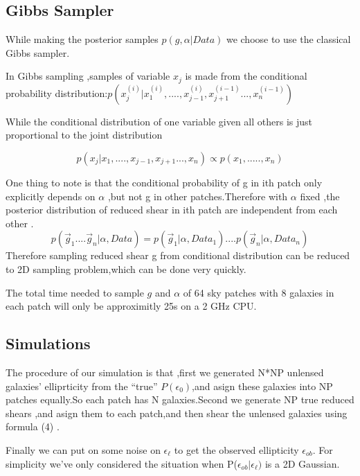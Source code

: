 \documentclass[useAMS,usenatbib]{mn2e}
\begin{document}
\subsection{Gibbs Sampler}

While making the posterior samples $p(g,\alpha|Data)$ we choose to
use the classical Gibbs sampler.

In Gibbs sampling ,samples of variable $x_{j}$ is made from the conditional
probability distribution:$p(x_{j}^{(i)}|x_{1}^{(i)},....,x_{j-1}^{(i)},x_{j+1}^{(i-1)}...,x_{n}^{(i-1)})$

While the conditional distribution of one variable given all others
is just proportional to the joint distribution

\begin{equation}
p(x_{j}|x_{1},....,x_{j-1},x_{j+1}...,x_{n})\varpropto p(x_{1},.....,x_{n})
\end{equation}


One thing to note is that the conditional probability of g in ith
patch only explicitly depends on $\alpha$ ,but not g in other patches.Therefore
with $\alpha$ fixed ,the posterior distribution of reduced shear
in ith patch are independent from each other . 
\begin{equation}
p(\vec{g}_{1}....\vec{g}_{n}|\alpha,Data)=p(\vec{g}_{1}|\alpha,Data_{1})....p(\vec{g}_{n}|\alpha,Data_{n})
\end{equation}
Therefore sampling reduced shear g from conditional distribution can
be reduced to 2D sampling problem,which can be done very quickly.

The total time needed to sample $g$ and $\alpha$ of 64 sky patches
with 8 galaxies in each patch will only be approximitly 25s on a 2
GHz CPU.


\subsection{Simulations}

The procedure of our simulation is that ,first we generated N{*}NP
unlensed galaxies' elliprticity from the ``true'' $P(\epsilon_{0})$,and
asign these galaxies into NP patches equally.So each patch has N galaxies.Second
we generate NP true reduced shears ,and asign them to each patch,and
then shear the unlensed galaxies using formula (4) .

Finally we can put on some noise on $\epsilon_{\ell}$ to get the
observed ellipticity $\epsilon_{ob}$. For simplicity we've only considered
the situation when P($\epsilon_{ob}|\epsilon_{\ell})$ is a 2D Gaussian.
\end{document}
